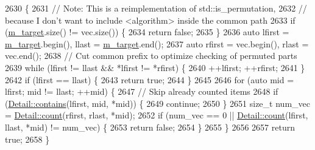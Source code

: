 \begin{DoxyCode}
2630                                                                    \{
2631                     \textcolor{comment}{// Note: This is a reimplementation of std::is\_permutation,}
2632                     \textcolor{comment}{//       because I don't want to include <algorithm> inside the common path}
2633                     \textcolor{keywordflow}{if} (\hyperlink{struct_catch_1_1_matchers_1_1_vector_1_1_unordered_equals_matcher_aaa39871eb4034d4335214215dd693712}{m\_target}.size() != vec.size()) \{
2634                         \textcolor{keywordflow}{return} \textcolor{keyword}{false};
2635                     \}
2636                     \textcolor{keyword}{auto} lfirst = \hyperlink{struct_catch_1_1_matchers_1_1_vector_1_1_unordered_equals_matcher_aaa39871eb4034d4335214215dd693712}{m\_target}.begin(), llast = \hyperlink{struct_catch_1_1_matchers_1_1_vector_1_1_unordered_equals_matcher_aaa39871eb4034d4335214215dd693712}{m\_target}.end();
2637                     \textcolor{keyword}{auto} rfirst = vec.begin(), rlast = vec.end();
2638                     \textcolor{comment}{// Cut common prefix to optimize checking of permuted parts}
2639                     \textcolor{keywordflow}{while} (lfirst != llast && *lfirst != *rfirst) \{
2640                         ++lfirst; ++rfirst;
2641                     \}
2642                     \textcolor{keywordflow}{if} (lfirst == llast) \{
2643                         \textcolor{keywordflow}{return} \textcolor{keyword}{true};
2644                     \}
2645 
2646                     \textcolor{keywordflow}{for} (\textcolor{keyword}{auto} mid = lfirst; mid != llast; ++mid) \{
2647                         \textcolor{comment}{// Skip already counted items}
2648                         \textcolor{keywordflow}{if} (\hyperlink{namespace_catch_1_1_matchers_1_1_vector_1_1_detail_a73a425534a3113c590fac55f64338d1e}{Detail::contains}(lfirst, mid, *mid)) \{
2649                             \textcolor{keywordflow}{continue};
2650                         \}
2651                         \textcolor{keywordtype}{size\_t} num\_vec = \hyperlink{namespace_catch_1_1_matchers_1_1_vector_1_1_detail_abca18680db20c92f848b02a2c2708852}{Detail::count}(rfirst, rlast, *mid);
2652                         \textcolor{keywordflow}{if} (num\_vec == 0 || \hyperlink{namespace_catch_1_1_matchers_1_1_vector_1_1_detail_abca18680db20c92f848b02a2c2708852}{Detail::count}(lfirst, llast, *mid) != num\_vec) \{
2653                             \textcolor{keywordflow}{return} \textcolor{keyword}{false};
2654                         \}
2655                     \}
2656 
2657                     \textcolor{keywordflow}{return} \textcolor{keyword}{true};
2658                 \}
\end{DoxyCode}


